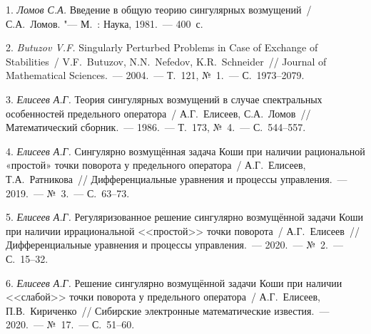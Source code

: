 \litlist

1. {\it Ломов С.А.} Введение в общую теорию сингулярных возмущений~/ С.А.~Ломов. "--- М.~: Наука, 1981.~--- 400~с.

2. {\it Butuzov V.F.} Singularly Perturbed Problems in Case of Exchange of Stabilities~/ V.F.~Butuzov, N.N.~Nefedov, K.R.~Schneider~// Journal of Mathematical Sciences.~--- 2004.~--- Т.~121, №~1.~--- С.~1973--2079.

3. {\it Елисеев А.Г.} Теория сингулярных возмущений в случае спектральных особенностей предельного оператора~/ А.Г.~Елисеев, \linebreak С.А.~Ломов~// Математический сборник.~--- 1986.~--- Т.~173, №~4.~--- С.~544--557.

4. {\it Елисеев А.Г.} Сингулярно возмущённая задача Коши при наличии рациональной «простой» точки поворота у предельного оператора~/ А.Г.~Елисеев, Т.А.~Ратникова~// Дифференциальные уравнения и процессы управления.~--- 2019.~--- №~3.~--- С.~63--73.

5. {\it Елисеев А.Г.} Регуляризованное решение сингулярно возмущённой задачи Коши при наличии иррациональной <<простой>> точки поворота~/ А.Г.~Елисеев~// Дифференциальные уравнения и процессы управления.~--- 2020.~--- №~2.~--- С.~15--32.

6. {\it Елисеев А.Г.} Решение сингулярно возмущённой задачи Коши при наличии <<слабой>> точки поворота у предельного оператора~/ А.Г.~Елисеев, П.В.~Кириченко~// Сибирские электронные математические известия.~--- 2020.~--- №~17.~--- С.~51--60.

